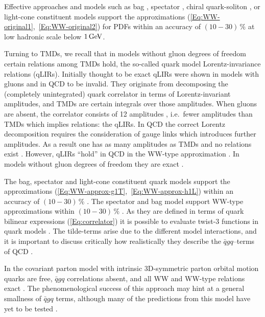 \documentclass[a4paper,11pt]{article}
\begin{document}
Effective approaches and models such as bag 
\cite{Jaffe:1991ra,Stratmann:1993aw,Signal:1996ct,Avakian:2010br},
spectator \cite{Jakob:1997wg}, chiral quark-soliton 
\cite{Wakamatsu:2000ex}, or light-cone 
constituent \cite{Pasquini:2008ax,Lorce:2011dv} models
support the approximations (\ref{Eq:WW-original1},~\ref{Eq:WW-original2}) 
for PDFs within an accuracy of $(10-30)\,\%$ at low hadronic scale 
below $1\,{\rm GeV}$. 

Turning to TMDs, we recall that in models without gluon 
degrees of freedom certain relations among TMDs hold, the 
so-called quark model Lorentz-invariance relations (qLIRs).
Initially thought to be exact \cite{Tangerman:1994bb,Mulders:1995dh}
qLIRs were shown in models with gluons \cite{Kundu:2001pk,Schlegel:2004rg} 
and in QCD \cite{Goeke:2003az} to be invalid.
They originate from decomposing the (completely unintegrated)
quark correlator in terms of Lorentz-invariant amplitudes, and 
TMDs are certain integrals over those amplitudes.
When gluons are absent, the correlator consists
of 12 amplitudes \cite{Tangerman:1994bb,Mulders:1995dh}, i.e.\ fewer 
amplitudes than TMDs which implies relations: the qLIRs. 
In QCD the correct Lorentz decomposition requires the consideration of 
gauge links which introduces further amplitudes. As a result one has 
as many amplitudes as TMDs and no relations exist \cite{Goeke:2003az}. 
However, qLIRs ``hold'' in QCD in the WW-type approximation 
\cite{Metz:2008ib}. In models without gluon degrees of freedom 
they are exact
\cite{Metz:2008ib,Teckentrup:2009tk,Avakian:2010br,Jakob:1997wg}. 

The bag, spectator and light-cone constituent quark models support 
the approximations (\ref{Eq:WW-approx-g1T},~\ref{Eq:WW-approx-h1L}) 
within an accuracy of $(10-30)\,\%$ 
\cite{Jakob:1997wg,Pasquini:2008ax,Avakian:2010br,Lorce:2011dv}.
The spectator and bag model support WW-type approximations 
within $(10-30)\,\%$ \cite{Avakian:2010br}. 
As they are defined in terms of quark bilinear expressions 
(\ref{Eq:correlator}) it is possible to evaluate twist-3 functions
in quark models \cite{Jaffe:1991ra}. The tilde-terms arise due to
the different model interactions, and it is important to discuss
critically how realistically they describe the $\bar{q}gq$--terms
of QCD \cite{Lorce:2014hxa,Lorce:2016ugb}.

In the covariant parton model with intrinsic 3D-symmetric parton 
orbital motion \cite{Zavada:1996kp}  quarks are free, $\bar qgq$ 
correlations absent, and all WW and WW-type relations exact
\cite{Efremov:2010mt,Efremov:2009ze}.
The phenomenological success of this approach \cite{Zavada:1996kp} may 
hint at a general smallness of $\bar qgq$ terms, although many of the 
predictions from this model have yet to be tested \cite{Efremov:2010mt}.
\end{document}
